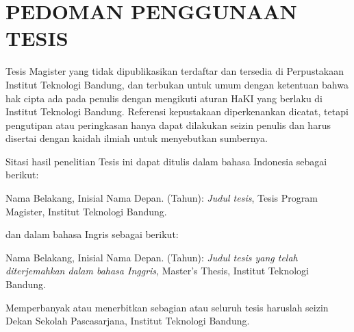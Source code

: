 \chapter{PEDOMAN PENGGUNAAN TESIS}
\label{chp:pedoman}
\vspace{\baselineskip}
Tesis Magister yang tidak dipublikasikan terdaftar dan tersedia di Perpustakaan Institut Teknologi Bandung, dan terbukan untuk umum dengan ketentuan bahwa hak cipta ada pada penulis dengan mengikuti aturan HaKI yang berlaku di Institut Teknologi Bandung. Referensi kepustakaan diperkenankan dicatat, tetapi pengutipan atau peringkasan hanya dapat dilakukan seizin penulis dan harus disertai dengan kaidah ilmiah untuk menyebutkan sumbernya.
\vspace{\baselineskip}

Sitasi hasil penelitian Tesis ini dapat ditulis dalam bahasa Indonesia sebagai berikut: \\

\begin{hangparas}{.25in}{1}
  Nama Belakang, Inisial Nama Depan. (Tahun): \emph{Judul tesis}, Tesis Program Magister, Institut Teknologi Bandung.
\end{hangparas}

\vspace{\baselineskip}

\noindent
dan dalam bahasa Ingris sebagai berikut:
\vspace{\baselineskip}

\begin{hangparas}{.25in}{1}
  Nama Belakang, Inisial Nama Depan. (Tahun): \emph{Judul tesis yang telah diterjemahkan dalam bahasa Inggris}, Master's Thesis, Institut Teknologi Bandung.
\end{hangparas}
\vspace{\baselineskip}

Memperbanyak atau menerbitkan sebagian atau seluruh tesis haruslah seizin Dekan Sekolah Pascasarjana, Institut Teknologi Bandung.